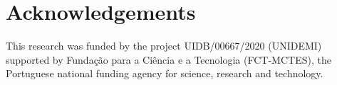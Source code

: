 \documentclass[3p,times,procedia]{elsarticle}
\begin{document}


\section*{Acknowledgements}

This research was funded by the project UIDB/00667/2020 (UNIDEMI) supported
by Fundação para a Ciência e a Tecnologia (FCT-MCTES), the Portuguese
national funding agency for science, research and technology.



%
\end{document}
